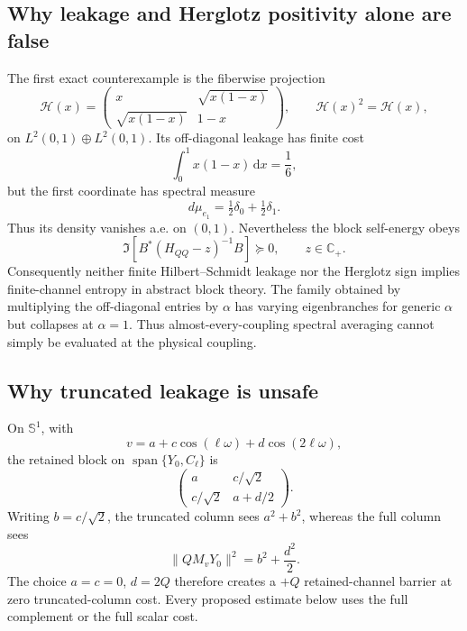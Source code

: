 \documentclass[11pt]{article}
\newcommand{\C}{\mathbb C}
\newcommand{\dd}{\,\mathrm d}
\theoremstyle{definition}
\theoremstyle{remark}
\begin{document}
\subsection{Why leakage and Herglotz positivity alone are false}

The first exact counterexample is the fiberwise projection
\begin{equation}
 \mathcal H(x)=
 \begin{pmatrix}
 x&\sqrt{x(1-x)}\\
 \sqrt{x(1-x)}&1-x
 \end{pmatrix},
 \qquad \mathcal H(x)^2=\mathcal H(x),
 \label{eq:fiber-counterexample}
\end{equation}
on $L^2(0,1)\oplus L^2(0,1)$.  Its off-diagonal leakage has finite cost
\begin{equation}
 \int_0^1x(1-x)\dd x=\frac16,
 \end{equation}
but the first coordinate has spectral measure
\begin{equation}
 d\mu_{e_1}=\tfrac12\delta_0+\tfrac12\delta_1.
\end{equation}
Thus its density vanishes a.e. on $(0,1)$.  Nevertheless the block self-energy obeys
\begin{equation}
 \Im\!\left[B^*(H_{QQ}-z)^{-1}B\right]\succeq0,
 \qquad z\in\C_+.
 \label{eq:audit-herglotz-insufficient}
\end{equation}
Consequently neither finite Hilbert--Schmidt leakage nor the Herglotz sign implies finite-channel entropy in abstract block theory.  The family obtained by multiplying the off-diagonal entries by $\alpha$ has varying eigenbranches for generic $\alpha$ but collapses at $\alpha=1$.  Thus almost-every-coupling spectral averaging cannot simply be evaluated at the physical coupling.

\subsection{Why truncated leakage is unsafe}

On $\mathbb S^1$, with
\begin{equation}
 v=a+c\cos(\ell\omega)+d\cos(2\ell\omega),
 \label{eq:alias-v}
\end{equation}
the retained block on $\operatorname{span}\{Y_0,C_\ell\}$ is
\begin{equation}
 \begin{pmatrix}
 a&c/\sqrt2\\ c/\sqrt2&a+d/2
 \end{pmatrix}.
 \label{eq:alias-block}
\end{equation}
Writing $b=c/\sqrt2$, the truncated column sees $a^2+b^2$, whereas the full column sees
\begin{equation}
 \|Q M_vY_0\|^2=b^2+\frac{d^2}{2}.
 \label{eq:alias-cost}
\end{equation}
The choice $a=c=0$, $d=2Q$ therefore creates a $+Q$ retained-channel barrier at zero truncated-column cost.  Every proposed estimate below uses the full complement or the full scalar cost.
\end{document}
